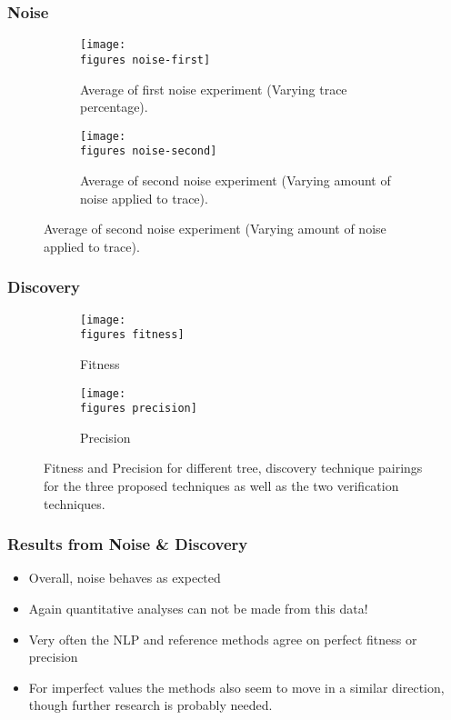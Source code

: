 \documentclass{beamer}
\newcommand{\figures}{../figures/}
\begin{document}
	\begin{frame}
		\frametitle{Noise}
		\begin{figure}
			\centering
			\begin{subfigure}[b]{0.49\textwidth}
				\centering
				\texttt{[image: \\figures noise-first]}
				\caption{Average of first noise experiment (Varying trace percentage).}
				\label{fig:noise-first}
			\end{subfigure}
			\hfill
			\begin{subfigure}[b]{0.49\textwidth}
				\centering
				\texttt{[image: \\figures noise-second]}
				\caption{Average of second noise experiment (Varying amount of noise applied to trace).}
				\label{fig:noise-second}
			\end{subfigure}
		\end{figure}
	\end{frame}
	
	
	\begin{frame}
		\frametitle{Discovery}
		\begin{figure}
			\centering
			\begin{subfigure}[b]{0.49\textwidth}
				\centering
				\texttt{[image: \\figures fitness]}
				\caption{Fitness}
				\label{fig:fitness}
			\end{subfigure}
			\hfill
			\begin{subfigure}[b]{0.49\textwidth}
				\centering
				\texttt{[image: \\figures precision]}
				\caption{Precision}
				\label{fig:precision}
			\end{subfigure}
			\caption{Fitness and Precision for different tree, discovery technique pairings for the three proposed techniques as well as the two verification techniques.}
			\label{fig:discovery}
		\end{figure}
	\end{frame}
	
	\begin{frame}
		\frametitle{Results from Noise \& Discovery}
		\begin{itemize}
			\item Overall, noise behaves as expected
			\item Again quantitative analyses can not be made from this data!
			\item Very often the NLP and reference methods agree on perfect fitness or precision
			\item For imperfect values the methods also seem to move in a similar direction, though further research is probably needed.
		\end{itemize}
	\end{frame}
	
\end{document}
